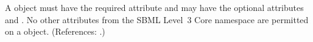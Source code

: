 A \RateRule object must have the required attribute  and
may have the optional attributes  and .  No
other attributes from the SBML Level~3 Core namespace are permitted on a
\RateRule object.  (References: .)
